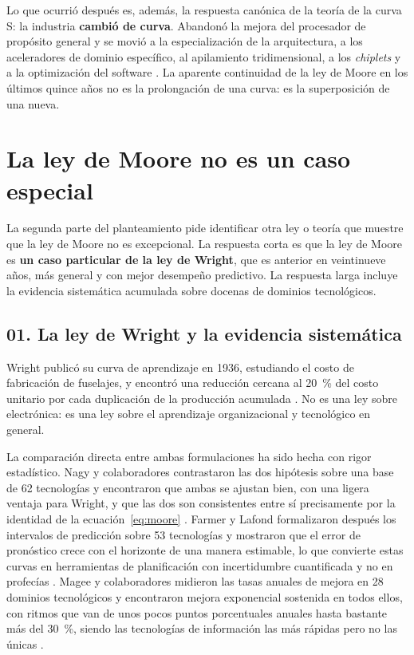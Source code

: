 \documentclass[11pt,letterpaper]{article}
\begin{document}
Lo que ocurrió después es, además, la respuesta canónica de la teoría de la curva
S: la industria \textbf{cambió de curva}. Abandonó la mejora del procesador de
propósito general y se movió a la especialización de la arquitectura, a los
aceleradores de dominio específico, al apilamiento tridimensional, a los
\emph{chiplets} y a la optimización del software
\parencite{hennessy2019,leiserson2020,thompson2021}. La aparente continuidad de
la ley de Moore en los últimos quince años no es la prolongación de una curva:
es la superposición de una nueva.

\section{La ley de Moore no es un caso especial}

La segunda parte del planteamiento pide identificar otra ley o teoría que
muestre que la ley de Moore no es excepcional. La respuesta corta es que la ley
de Moore es \textbf{un caso particular de la ley de Wright}, que es anterior en
veintinueve años, más general y con mejor desempeño predictivo. La respuesta
larga incluye la evidencia sistemática acumulada sobre docenas de dominios
tecnológicos.

\subsection*{01. La ley de Wright y la evidencia sistemática}

Wright publicó su curva de aprendizaje en 1936, estudiando el costo de
fabricación de fuselajes, y encontró una reducción cercana al
\SI{20}{\percent} del costo unitario por cada duplicación de la producción
acumulada \parencite{wright1936}. No es una ley sobre electrónica: es una ley
sobre el aprendizaje organizacional y tecnológico en general.

La comparación directa entre ambas formulaciones ha sido hecha con rigor
estadístico. Nagy y colaboradores contrastaron las dos hipótesis sobre una base
de \num{62} tecnologías y encontraron que ambas se ajustan bien, con una ligera
ventaja para Wright, y que las dos son consistentes entre sí precisamente por la
identidad de la ecuación~\eqref{eq:moore} \parencite{nagy2013}. Farmer y Lafond
formalizaron después los intervalos de predicción sobre \num{53} tecnologías y
mostraron que el error de pronóstico crece con el horizonte de una manera
estimable, lo que convierte estas curvas en herramientas de planificación con
incertidumbre cuantificada y no en profecías \parencite{farmer2016}. Magee y
colaboradores midieron las tasas anuales de mejora en \num{28} dominios
tecnológicos y encontraron mejora exponencial sostenida en todos ellos, con
ritmos que van de unos pocos puntos porcentuales anuales hasta bastante más del
\SI{30}{\percent}, siendo las tecnologías de información las más rápidas pero no
las únicas \parencite{magee2016,koh2006}.
\end{document}
